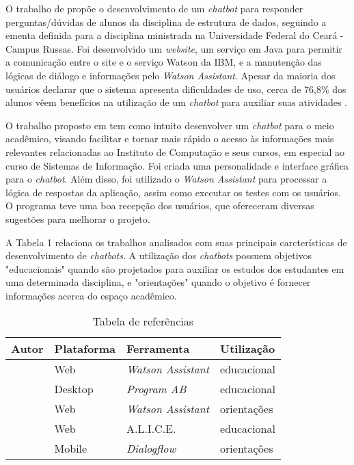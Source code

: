 \documentclass[12pt]{article}
\begin{document}
O trabalho de \cite{araujo:20} propõe o desenvolvimento de um {\itshape chatbot} para responder perguntas/dúvidas de alunos da disciplina de estrutura de dados, seguindo a ementa definida para a disciplina ministrada na Universidade Federal do Ceará - Campus Russas. Foi desenvolvido um {\itshape website}, um serviço em Java para permitir a comunicação entre o site e o serviço Watson da IBM, e a manutenção das lógicas de diálogo e informações pelo {\itshape Watson Assistant}. Apesar da maioria dos usuários declarar que o sistema apresenta dificuldades de uso, cerca de 76,8\% dos alunos  vêem benefícios na utilização de um {\itshape chatbot} para auxiliar suas atividades   .

O trabalho proposto em \cite{catbot:19} tem como intuito desenvolver um {\itshape chatbot} para o meio acadêmico, visando facilitar e tornar mais rápido o acesso às informações mais relevantes relacionadas ao Instituto de Computação e seus cursos, em especial ao curso de Sistemas de Informação. Foi criada uma personalidade e interface gráfica para o {\itshape chatbot}. Além disso, foi utilizado o {\itshape Watson Assistant} para processar a lógica de respostas da aplicação, assim como executar os testes com os usuários. O programa teve uma boa recepção dos usuários, que ofereceram diversas sugestões para melhorar o projeto.

A Tabela 1 relaciona os trabalhos analisados com suas principais carcterísticas de desenvolvimento de {\itshape chatbots}. A utilização dos {\itshape chatbots} possuem objetivos "educacionais" quando são projetados para auxiliar os estudos dos estudantes em uma determinada disciplina, e "orientações" quando o objetivo é fornecer informações acerca do espaço acadêmico.

\begin{table}[h!]
\caption{Tabela de referências}
\label{table:1}
\begin{tabular}{ |p{3cm}||p{3cm}|p{3cm}|p{3cm}|  }
 \hline
Autor & Plataforma & Ferramenta & Utilização\\
 \hline
 \cite{araujo:20}   & Web    & {\itshape Watson Assistant} &   educacional\\
 \cite{bulhoes:20}&   Desktop  & {\itshape Program AB}   & educacional\\
 \cite{catbot:19} & Web & {\itshape Watson Assistant} &  orientações\\
 \cite{lucchesi:18}    & Web & A.L.I.C.E. & educacional\\
 \cite{maciel:19}  & Mobile  & {\itshape Dialogflow} & orientações\\
 \hline
\end{tabular}
\end{table}
\end{document}
